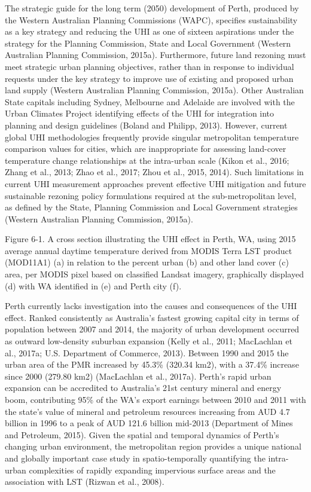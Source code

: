 \documentclass[]{book}
\begin{document}
The strategic guide for the long term (2050) development of Perth,
produced by the Western Australian Planning Commissions (WAPC),
specifies sustainability as a key strategy and reducing the UHI as one
of sixteen aspirations under the strategy for the Planning Commission,
State and Local Government (Western Australian Planning Commission,
2015a). Furthermore, future land rezoning must meet strategic urban
planning objectives, rather than in response to individual requests
under the key strategy to improve use of existing and proposed urban
land supply (Western Australian Planning Commission, 2015a). Other
Australian State capitals including Sydney, Melbourne and Adelaide are
involved with the Urban Climates Project identifying effects of the UHI
for integration into planning and design guidelines (Boland and Philipp,
2013). However, current global UHI methodologies frequently provide
singular metropolitan temperature comparison values for cities, which
are inappropriate for assessing land-cover temperature change
relationships at the intra-urban scale (Kikon et al., 2016; Zhang et
al., 2013; Zhao et al., 2017; Zhou et al., 2015, 2014). Such limitations
in current UHI measurement approaches prevent effective UHI mitigation
and future sustainable rezoning policy formulations required at the
sub-metropolitan level, as defined by the State, Planning Commission and
Local Government strategies (Western Australian Planning Commission,
2015a).

Figure 6-1. A cross section illustrating the UHI effect in Perth, WA,
using 2015 average annual daytime temperature derived from MODIS Terra
LST product (MOD11A1) (a) in relation to the percent urban (b) and other
land cover (c) area, per MODIS pixel based on classified Landsat
imagery, graphically displayed (d) with WA identified in (e) and Perth
city (f).

Perth currently lacks investigation into the causes and consequences of
the UHI effect. Ranked consistently as Australia's fastest growing
capital city in terms of population between 2007 and 2014, the majority
of urban development occurred as outward low-density suburban expansion
(Kelly et al., 2011; MacLachlan et al., 2017a; U.S. Department of
Commerce, 2013). Between 1990 and 2015 the urban area of the PMR
increased by 45.3\% (320.34 km2), with a 37.4\% increase since 2000
(279.80 km2) (MacLachlan et al., 2017a). Perth's rapid urban expansion
can be accredited to Australia's 21st century mineral and energy boom,
contributing 95\% of the WA's export earnings between 2010 and 2011 with
the state's value of mineral and petroleum resources increasing from AUD
4.7 billion in 1996 to a peak of AUD 121.6 billion mid-2013 (Department
of Mines and Petroleum, 2015). Given the spatial and temporal dynamics
of Perth's changing urban environment, the metropolitan region provides
a unique national and globally important case study in spatio-temporally
quantifying the intra-urban complexities of rapidly expanding impervious
surface areas and the association with LST (Rizwan et al., 2008).
\end{document}
